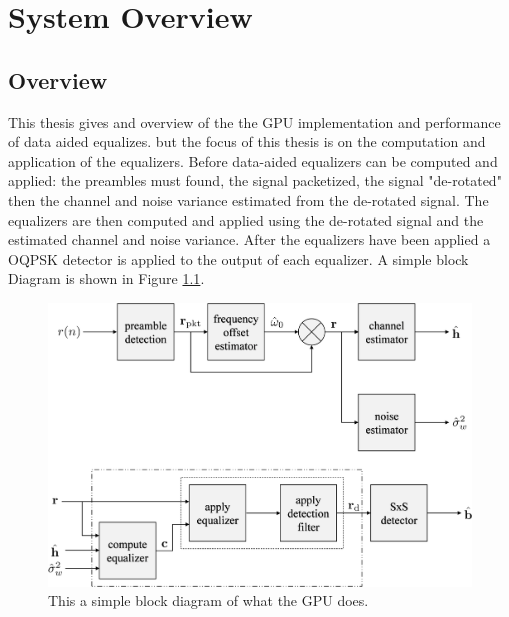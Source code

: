 

\chapter{System Overview}
\label{sec:systemOverview}

\section{Overview}
This thesis gives and overview of the the GPU implementation and performance of data aided equalizes.
but the focus of this thesis is on the computation and application of the equalizers.
Before data-aided equalizers can be computed and applied: the preambles must found, the signal packetized, the signal "de-rotated" then the channel and noise variance estimated from the de-rotated signal.
The equalizers are then computed and applied using the de-rotated signal and the estimated channel and noise variance.
After the equalizers have been applied a OQPSK detector is applied to the output of each equalizer.
A simple block Diagram is shown in Figure \ref{fig:simpleBlockDiagram}.
\begin{figure}
	\centering\includegraphics[width=6in]{figures/systemOverview/blockDiagram.pdf}
	\caption{This a simple block diagram of what the GPU does.}
	\label{fig:simpleBlockDiagram}
\end{figure}

